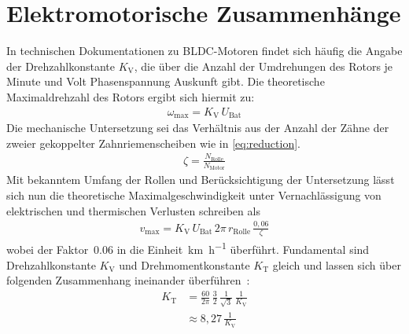 	\section{Elektromotorische Zusammenhänge}
		In technischen Dokumentationen zu BLDC-Motoren findet sich häufig die Angabe der Drehzahlkonstante \(K_\text{V}\), die über die Anzahl der Umdrehungen des Rotors je Minute und Volt Phasenspannung Auskunft gibt.
		Die theoretische Maximaldrehzahl des Rotors ergibt sich hiermit zu:
		\begin{align}
			\omega_\text{max} = K_\text{V} \, U_\text{Bat}
			\label{eq:max rpm}
		\end{align}%
		Die mechanische Untersetzung sei das Verhältnis aus der Anzahl der Zähne der zweier gekoppelter Zahnriemenscheiben wie in \cref{eq:reduction}.
		\begin{align}
			\zeta = \frac{N_\text{Rolle}}{N_\text{Motor}}
			\label{eq:reduction}
		\end{align}%
		Mit bekanntem Umfang der Rollen und Berücksichtigung der Untersetzung lässt sich nun die theoretische Maximalgeschwindigkeit unter Vernachlässigung von elektrischen und thermischen Verlusten schreiben als
		\begin{align}
			v_\text{max} = K_\text{V} \, U_\text{Bat} \, 2\pi \, r_\text{Rolle} \, \frac{0,06}{\zeta}
			\label{eq:max speed km h}
		\end{align}%
		wobei der Faktor~\num{0,06} in  die Einheit~\unit{\kilo\metre\per\hour} überführt.
		Fundamental sind Drehzahlkonstante \(K_\text{V}\) und Drehmomentkonstante \(K_\text{T}\) gleich und lassen sich über folgenden Zusammenhang ineinander überführen~\cites{mevey2009sensorless}{DalY.Ohm.2000}{AN885.BLDC.fundamentals}:
		\begin{align}
			K_\text{T}	&= \frac{60}{2\pi} \, \frac{3}{2} \, \frac{1}{\sqrt{3}} \, \frac{1}{K_\text{V}} \nonumber \\
				&\approx 8,27 \, \frac{1}{K_\text{V}}
			\label{eq:kv to kt}
		\end{align}%
